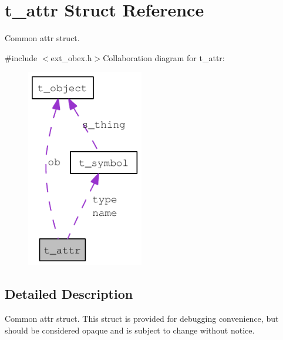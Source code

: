 \hypertarget{structt__attr}{
\section{t\_\-attr Struct Reference}
\label{structt__attr}
}


Common attr struct.  


{\ttfamily \#include $<$ext\_\-obex.h$>$}Collaboration diagram for t\_\-attr:\nopagebreak
\begin{figure}[H]
\begin{center}
\leavevmode
\includegraphics[width=145pt]{structt__attr__coll__graph}
\end{center}
\end{figure}


\subsection{Detailed Description}
Common attr struct. This struct is provided for debugging convenience, but should be considered opaque and is subject to change without notice. 